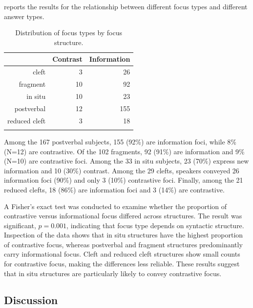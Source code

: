  reports the results for the relationship between different focus types and different answer types.

\begin{table}[ht]
\centering
\begin{tabular}{rrr}
  \lsptoprule
 & \textbf{Contrast} & \textbf{Information} \\ 
  \midrule
cleft &   3 &  26 \\ 
  fragment &  10 &  92 \\ 
  in situ &  10 &  23 \\ 
  postverbal &  12 & 155 \\ 
  reduced cleft &   3 &  18 \\ 
   \lspbottomrule
\end{tabular}
\caption{Distribution of focus types by focus structure.}
\label{tab:4.3}
\end{table}


 Among the 167 postverbal subjects, 155 (92\%) are information foci, while 8\% (N=12) are contrastive. Of the 102 fragments, 92 (91\%) are information and 9\% (N=10) are contrastive foci. Among the 33 in situ subjects, 23 (70\%) express new information and 10 (30\%) contrast. Among the 29 clefts, speakers conveyed 26 information foci (90\%) and only 3 (10\%) contrastive foci. Finally, among the 21 reduced clefts, 18 (86\%) are information foci and 3 (14\%) are contrastive.
 
 A Fisher's exact test was conducted to examine whether the proportion of contrastive versus informational focus differed across structures. The result was significant, $p = 0.001$, indicating that focus type depends on syntactic structure. Inspection of the data shows that in situ structures have the highest proportion of contrastive focus, whereas postverbal and fragment structures predominantly carry informational focus. Cleft and reduced cleft structures show small counts for contrastive focus, making the differences less reliable. These results suggest that in situ structures are particularly likely to convey contrastive focus.


\subsection{Discussion} \label{sub:4.5.1}

